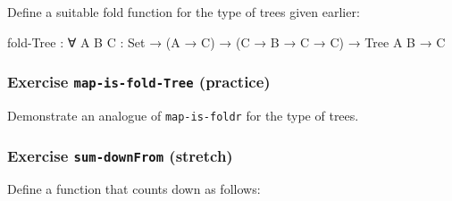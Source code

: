 Define a suitable fold function for the type of trees given earlier:

\begin{myDisplay}
fold-Tree : ∀ {A B C : Set} → (A → C) → (C → B → C → C) → Tree A B → C
\end{myDisplay}

\begin{fence}
\begin{code}%
\>[0]\<%
\end{code}
\end{fence}

\hypertarget{exercise-map-is-fold-tree-practice}{%
\subsubsection{\texorpdfstring{Exercise \texttt{map-is-fold-Tree}
(practice)}{Exercise map-is-fold-Tree (practice)}}\label{exercise-map-is-fold-tree-practice}}

Demonstrate an analogue of \texttt{map-is-foldr} for the type of trees.

\begin{fence}
\begin{code}%
\>[0]\<%
\end{code}
\end{fence}

\hypertarget{exercise-sum-downfrom-stretch}{%
\subsubsection{\texorpdfstring{Exercise \texttt{sum-downFrom}
(stretch)}{Exercise sum-downFrom (stretch)}}\label{exercise-sum-downfrom-stretch}}

Define a function that counts down as follows:

\begin{fence}
\begin{code}%
\>[0]\AgdaSpace{}%
\AgdaSymbol{:}\AgdaSpace{}%
\AgdaSpace{}%
\AgdaSpace{}%
\AgdaSpace{}%
\<%
\\
\>[0]\AgdaSpace{}%
%
\>[18]\AgdaSymbol{=}%
\>[21]\AgdaInductiveConstructor{[]}\<%
\\
\>[0]\AgdaSpace{}%
\AgdaSymbol{(}\AgdaSpace{}%
\AgdaSymbol{)}%
\>[18]\AgdaSymbol{=}%
\>[21]\AgdaSpace{}%
\AgdaSpace{}%
\AgdaSpace{}%
\<%
\end{code}
\end{fence}

